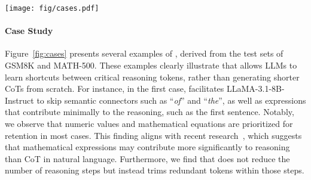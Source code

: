 \begin{figure*}[t]
\centering
\texttt{[image: fig/cases.pdf]}
\caption{Three CoT compression examples from \method. For each sample, we list the question, original CoT outputs from corresponding LLMs, and the compressed CoT by \method. The tokens that appear in both the original CoT and the compressed CoT are highlighted in \hl{red}.}
\label{fig:cases}
\end{figure*}

\paragraph{Case Study} 
Figure~\ref{fig:cases} presents several examples of \method, derived from the test sets of GSM8K and MATH-500. These examples clearly illustrate that \method allows LLMs to learn shortcuts between critical reasoning tokens, rather than generating shorter CoTs from scratch. For instance, in the first case, \method facilitates LLaMA-3.1-8B-Instruct to skip semantic connectors such as ``\textit{of}'' and ``\textit{the}'', as well as expressions that contribute minimally to the reasoning, such as the first sentence. Notably, we observe that numeric values and mathematical equations are prioritized for retention in most cases. This finding aligns with recent research~\cite{Ma:2024mathmatters}, which suggests that mathematical expressions may contribute more significantly to reasoning than CoT in natural language. Furthermore, we find that \method does not reduce the number of reasoning steps but instead trims redundant tokens within those steps.